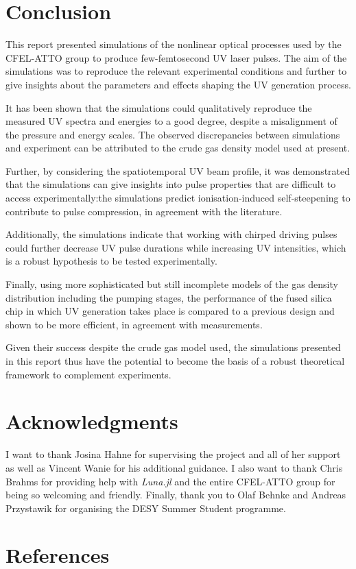 \documentclass[a4paper]{jpconf}
\begin{document}
\section{Conclusion}
This report presented simulations of the nonlinear optical processes used by the CFEL-ATTO group to produce few-femtosecond UV laser pulses. The aim of the simulations was to reproduce the relevant experimental conditions and further to give insights about the parameters and effects shaping the UV generation process. \par 
It has been shown that the simulations could qualitatively reproduce the measured UV spectra and energies to a good degree, despite a misalignment of the pressure and energy scales. The observed discrepancies between simulations and experiment can be attributed to the crude gas density model used at present.  \par 
Further, by considering the spatiotemporal UV beam profile, it was demonstrated that the simulations can give insights into pulse properties that are difficult to access experimentally:the simulations predict ionisation-induced self-steepening to contribute to pulse compression, in agreement with the literature. \par 
Additionally, the simulations indicate that working with chirped driving pulses could further decrease UV pulse durations while increasing UV intensities, which is a robust hypothesis to be tested experimentally. \par 
Finally, using more sophisticated but still incomplete models of the gas density distribution including the pumping stages, the performance of the fused silica chip in which UV generation takes place is compared to a previous design and shown to be more efficient, in agreement with measurements. \par 
Given their success despite the crude gas model used, the simulations presented in this report thus have the potential to become the basis of a robust theoretical framework to complement experiments. 

\section*{Acknowledgments}
I want to thank Josina Hahne for supervising the project and all of her support as well as Vincent Wanie for his additional guidance. I also want to thank Chris Brahms for providing help with \textit{Luna.jl} and the entire CFEL-ATTO group for being so welcoming and friendly. Finally, thank you to Olaf Behnke and Andreas Przystawik for organising the DESY Summer Student programme. 

\section*{References}


\end{document}
